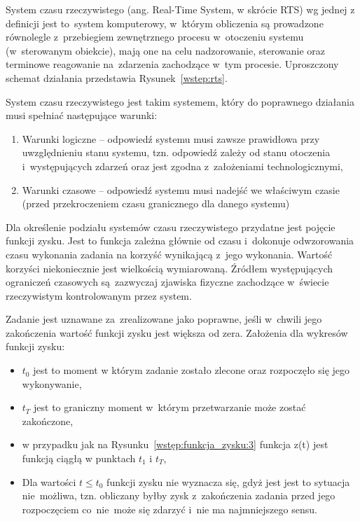 System czasu rzeczywistego (ang. Real-Time System, w skrócie RTS) wg jednej z definicji jest to~system komputerowy, w~którym obliczenia są prowadzone równolegle z~przebiegiem zewnętrznego procesu w~otoczeniu systemu (w~sterowanym obiekcie), mają one na celu nadzorowanie, sterowanie oraz terminowe reagowanie na~zdarzenia zachodzące w~tym procesie. Uproszczony schemat działania przedstawia Rysunek~\ref{wstep:rts}.

System czasu rzeczywistego jest takim systemem, który do poprawnego działania musi spełniać następujące warunki:
\begin{enumerate}
\item Warunki logiczne -- odpowiedź systemu musi zawsze prawidłowa przy uwzględnieniu stanu systemu, tzn. odpowiedź zależy od stanu otoczenia i~występujących zdarzeń oraz jest zgodna z~założeniami technologicznymi,
\item Warunki czasowe -- odpowiedź systemu musi nadejść we właściwym czasie (przed przekroczeniem czasu granicznego dla danego systemu)
\end{enumerate}

Dla określenie podziału systemów czasu rzeczywistego przydatne jest pojęcie funkcji zysku. Jest to funkcja zależna głównie od czasu i~dokonuje odwzorowania czasu wykonania zadania na korzyść wynikającą z~jego wykonania. Wartość korzyści niekoniecznie jest wielkością wymiarowaną. Źródłem występujących ograniczeń czasowych są~zazwyczaj zjawiska fizyczne zachodzące w~świecie rzeczywistym kontrolowanym przez system.

Zadanie jest uznawane za~zrealizowane jako poprawne, jeśli w~chwili jego zakończenia wartość funkcji zysku jest większa od zera.
Założenia dla wykresów funkcji zysku:
\begin{itemize}
\item $t_0$ jest to moment w którym zadanie zostało zlecone oraz rozpoczęło się jego wykonywanie,
\item $t_T$ jest to graniczny moment w~którym przetwarzanie może zostać zakończone,
\item w przypadku jak na Rysunku~\ref{wstęp:funkcja_zysku:3} funkcja z(t) jest funkcją ciągłą w punktach $t_1$ i $t_T$,
\item Dla wartości $t \leq t_0$ funkcji zysku nie wyznacza się, gdyż jest jest to sytuacja nie~możliwa, tzn. obliczany byłby zysk z~zakończenia zadania przed jego rozpoczęciem co~nie~może się zdarzyć i~nie ma najmniejszego sensu.
\end{itemize}

